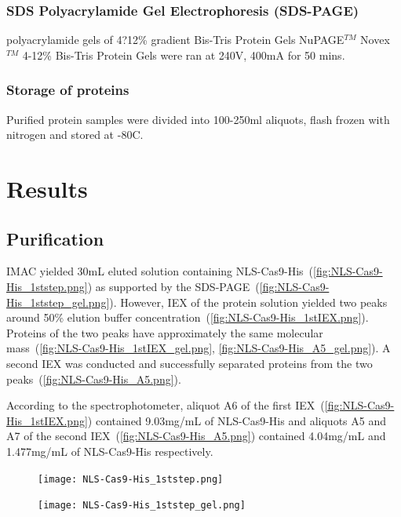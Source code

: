 \documentclass[11pt]{article}
\begin{document}
\subsubsection{SDS Polyacrylamide Gel Electrophoresis (SDS-PAGE)}
polyacrylamide gels of 4?12\% gradient  Bis-Tris Protein Gels NuPAGE$^{TM}$ Novex$^{TM}$ 4-12\% Bis-Tris Protein Gels were ran at 240V, 400mA for 50 mins.

\subsubsection{Storage of proteins}
Purified protein samples were divided into 100-250ml aliquots, flash frozen with nitrogen and stored at -80\degree C.

\section{Results}
\subsection{Purification}
IMAC yielded 30mL eluted solution containing NLS-Cas9-His~(\autoref{fig:NLS-Cas9-His_1ststep.png}) as supported by the SDS-PAGE~(\autoref{fig:NLS-Cas9-His_1ststep_gel.png}). However, IEX of the protein solution yielded two peaks around 50\% elution buffer concentration~(\autoref{fig:NLS-Cas9-His_1stIEX.png}). Proteins of the two peaks have approximately the same molecular mass~(\autoref{fig:NLS-Cas9-His_1stIEX_gel.png}, \autoref{fig:NLS-Cas9-His_A5_gel.png}). A second IEX was conducted and successfully separated proteins from the two peaks~(\autoref{fig:NLS-Cas9-His_A5.png}).

According to the spectrophotometer, aliquot A6 of the first IEX~(\autoref{fig:NLS-Cas9-His_1stIEX.png}) contained 9.03mg/mL of NLS-Cas9-His and aliquots A5 and A7 of the second IEX~(\autoref{fig:NLS-Cas9-His_A5.png}) contained 4.04mg/mL and 1.477mg/mL of NLS-Cas9-His respectively.
\\

\begin{figure}[H]
  \centering
    \texttt{[image: NLS-Cas9-His\_1ststep.png]}
    \label{fig:NLS-Cas9-His_1ststep.png}
\end{figure}

\begin{figure}[H]
  \centering
    \texttt{[image: NLS-Cas9-His\_1ststep\_gel.png]}
    \captionsetup{justification=centering}
  \label{fig:NLS-Cas9-His_1ststep_gel.png}
\end{figure}
\end{document}
